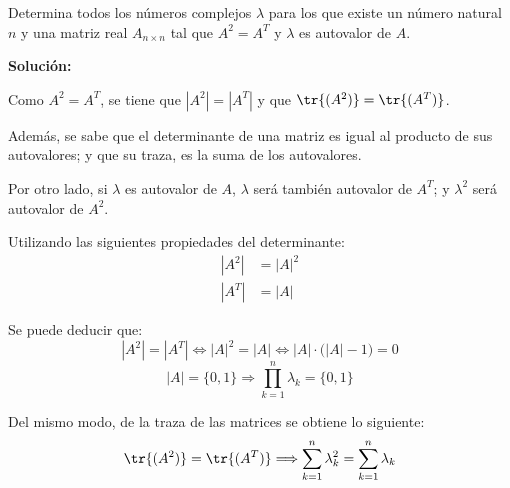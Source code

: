 \documentclass[../../main.tex]{subfiles}
\begin{document}
  \begin{shaded}
    Determina todos los números complejos $\lambda$ para los que existe un número natural $n$ y una matriz real $A_{n \times n}$ tal que $A^2 = A^T$ y $\lambda$ es autovalor de $A$.
  \end{shaded}

  \textbf{Solución:}

  Como $A^2 = A^T$, se tiene que $|A^2| = |A^T|$ y que $\tr{(A^2)} = \tr{(A^T)}$.

  Además, se sabe que el determinante de una matriz es igual al producto de sus autovalores; y que su traza, es la suma de los autovalores.

  Por otro lado, si $\lambda$ es autovalor de $A$, $\lambda$ será también autovalor de $A^T$; y $\lambda^2$ será autovalor de $A^2$.

  Utilizando las siguientes propiedades del determinante:
  \begin{align*}
    |A^2| & =  |A|^2
    \\
    |A^T| & =  |A|
  \end{align*}

  Se puede deducir que:
  $$
  |A^2| = |A^T|
  \iff
  |A|^2 = |A|
  \iff
  |A| \cdot \big(|A| - 1\big) = 0
  $$
  $$
  |A| = \{0, 1\}\Longrightarrow \prod_{k = 1}^n \lambda_k = \{0, 1\}
  $$

  Del mismo modo, de la traza de las matrices se obtiene lo siguiente:
  $$
  \tr{(A^2)} = \tr{(A^T)} \Longrightarrow \sum_{k = 1}^n \lambda_k^2 = \sum_{k = 1}^n \lambda_k
  $$
\end{document}
